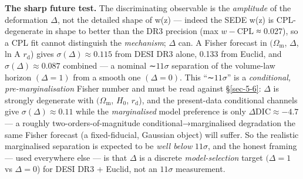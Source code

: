 \documentclass[preprint,12pt]{elsarticle}
\begin{document}
\textbf{The sharp future test.} The discriminating observable is the
\emph{amplitude} of the deformation \(\Delta\), not the detailed shape
of w(z) --- indeed the SEDE w(z) is CPL-degenerate in shape to better
than the DR3 precision (max \textbar{}\(w - \mathrm{CPL}\)\textbar{} ≈
0.027), so a CPL fit cannot distinguish the \emph{mechanism}; \(\Delta\)
can. A Fisher forecast in \((\Omega _{\mathrm{m}}\), \(\Delta\), ln A
\(r_{\mathrm{d}}\)) gives \(\sigma (\Delta ) \approx  0.115\) from DESI
DR3 alone, 0.133 from Euclid, and \(\sigma (\Delta ) \approx  0.087\)
combined --- a nominal ∼\(11\sigma\) separation of the volume-law
horizon \((\Delta  = 1)\) from a smooth one \((\Delta  = 0)\). This
``∼\(11\sigma\)'' is a \emph{conditional, pre-marginalisation} Fisher
number and must be read against §\ref{sec-5-6}: \(\Delta\) is strongly
degenerate with \((\Omega _{\mathrm{m}}\), \(H_{0}\),
\(r_{\mathrm{d}}\)), and the present-data conditional channels give
\(\sigma (\Delta ) \approx  0.11\) while the \emph{marginalised} model
preference is only \(\Delta \mathrm{DIC} \approx  -4.7\) --- a roughly
two-orders-of-magnitude conditional→marginalised degradation the same
Fisher forecast (a fixed-fiducial, Gaussian object) will suffer. So the
realistic marginalised separation is expected to be \emph{well below}
\(11\sigma\), and the honest framing --- used everywhere else --- is
that \(\Delta\) is a discrete \emph{model-selection} target
\((\Delta  = 1\) vs \(\Delta  = 0\)) for DESI DR3 + Euclid, not an
\(11\sigma\) measurement.
\end{document}
